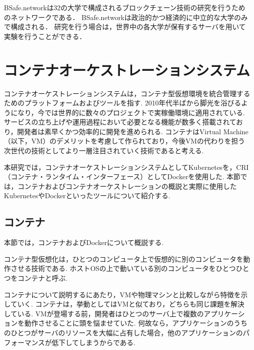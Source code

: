 BSafe.networkは32の大学で構成されるブロックチェーン技術の研究を行うためのネットワークである．
BSafe.networkは政治的かつ経済的に中立的な大学のみで構成される．
研究を行う場合は，世界中の各大学が保有するサーバを用いて実験を行うことができる．

\section{コンテナオーケストレーションシステム}
\label{background:container-orchestration-system}

コンテナオーケストレーションシステムは，コンテナ型仮想環境を統合管理するためのプラットフォームおよびツールを指す.
2010年代半ばから脚光を浴びるようになり，今では世界的に数々のプロジェクトで実稼働環境に適用されている.
サービスの立ち上げや運用過程において必要となる機能が数多く搭載されており，開発者は素早くかつ効率的に開発を進められる.
コンテナはVirtual Machine（以下，VM）のデメリットを考慮して作られており，今後VMの代わりを担う次世代の技術としてより一層注目されていく技術であると考える.

本研究では，コンテナオーケストレーションシステムとしてKubernetesを，CRI（コンテナ・ランタイム・インターフェース）としてDockerを使用した.
本節では，コンテナおよびコンテナオーケストレーションの概説と実際に使用したKubernetesやDockerといったツールについて紹介する.

\subsection{コンテナ}
\label{background:container-orchestration-system:container}

本節では，コンテナおよびDockerについて概説する.

コンテナ型仮想化は，ひとつのコンピュータ上で仮想的に別のコンピュータを動作させる技術である.
ホストOSの上で動いている別のコンピュータをひとつひとつをコンテナと呼ぶ.

コンテナについて説明するにあたり，VMや物理マシンと比較しながら特徴を示していく.
コンテナは，挙動としてはVMと似ており，どちらも同じ課題を解決している.
VMが登場する前，開発者はひとつのサーバ上で複数のアプリケーションを動作させることに頭を悩ませていた.
何故なら，アプリケーションのうちのひとつがサーバのリソースを大幅に占有した場合，他のアプリケーションのパフォーマンスが低下してしまうからである.

